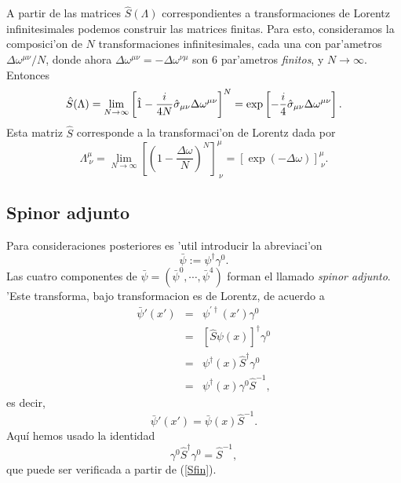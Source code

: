 A partir de las matrices $\hat{S}(\Lambda)$ correspondientes a
transformaciones de Lorentz infinitesimales podemos construir 
las matrices finitas. Para esto, consideramos la composici'on de $N$
transformaciones infinitesimales, cada una con par'ametros $\Delta \omega^{\mu
\nu }/N$, donde ahora $\Delta \omega^{\mu \nu }=-\Delta \omega^{\nu\mu}$ son
6 par'ametros \textit{finitos}, y $N\rightarrow\infty$. Entonces
\begin{equation}
\hat{S}(\Lambda) =\lim_{N\rightarrow \infty }\left[ \hat{1}-\frac{i}{4N}\hat{%
\sigma}_{\mu \nu }\Delta \omega^{\mu \nu }\right]^{N}
=\exp\left[-\frac{i}{4}\hat{\sigma}_{\mu \nu }\Delta \omega^{\mu \nu }\right].
\label{Sfin}
\end{equation}
Esta matriz $\hat{S}$ corresponde a la transformaci'on de Lorentz dada por
\begin{equation}
\Lambda^\mu_{\ \nu}=\lim_{N\rightarrow \infty }\left[\left(1-\frac{\Delta
\omega}{N}\right)^{N}\right]^\mu_{\ \nu}
=\left[\exp(-\Delta\omega)\right]^\mu_{\ \nu}.
\end{equation}


\subsection{Spinor adjunto}

Para consideraciones posteriores es 'util introducir la abreviaci'on 
\begin{equation}
\bar{\psi}:=\psi^{\dagger }\gamma^0.
\end{equation}
Las cuatro componentes de $\bar{\psi}=(\bar{\psi}^0,\cdots,\bar{\psi}^4)$
forman el llamado \textit{spinor adjunto}. 'Este transforma, bajo transformacion
es de Lorentz, de acuerdo a
\begin{eqnarray*}
\bar{\psi}' (x') &=&\psi^{\prime \dagger
}(x') \gamma^0 \\
&=&\left[ \hat{S}\psi (x) \right]^{\dagger }\gamma^0 \\
&=&\psi^{\dagger }(x) \hat{S}^{\dagger }\gamma^0 \\
&=&\psi^{\dagger }(x) \gamma^0\hat{S}^{-1},
\end{eqnarray*}
es decir, 
\begin{equation}
\bar{\psi}' (x') =\bar{\psi}(x) 
\hat{S}^{-1}.
\end{equation}
Aquí hemos usado la identidad
\begin{equation}
 \gamma^0\hat{S}^\dagger\gamma^0=\hat{S}^{-1},
\end{equation} 
que puede ser verificada a partir de (\ref{Sfin}).

